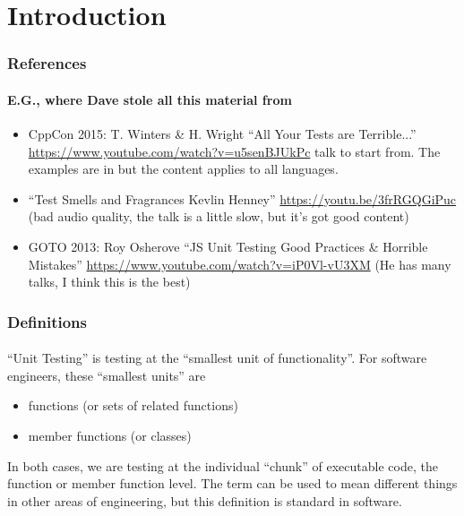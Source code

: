 \section{Introduction}

\begin{frame}[fragile]
\frametitle{References}
\framesubtitle{E.G., where Dave stole all this material from}

\begin{itemize}
\item CppCon 2015: T. Winters \& H. Wright ``All Your Tests are Terrible...''
  \url{https://www.youtube.com/watch?v=u5senBJUkPc}
   talk to start from.  The examples are in \CC but the
  content applies to all languages.
\vskip 6pt
\item ``Test Smells and Fragrances Kevlin Henney''
  \url{https://youtu.be/3frRGQGiPuc} (bad audio
  quality, the talk is a little slow, but it's got good content)



\item GOTO 2013: Roy Osherove ``JS Unit Testing Good Practices \& Horrible Mistakes''
\url{https://www.youtube.com/watch?v=iP0Vl-vU3XM}  (He has many talks,
I think this is the best)

\end{itemize}


\end{frame}


\begin{frame}[fragile]
\frametitle{Definitions}
\framesubtitle{}
``Unit Testing'' is testing at the ``smallest unit of
functionality''.  For software engineers, these 
``smallest units'' are
\begin{itemize}
\item functions (or sets of related functions)
\item member functions (or classes)
\end{itemize}

In both cases, we are testing at the individual ``chunk'' of
executable code, the function or member function level.
\vskip 6pt
The term can be used to mean different things in other areas of
engineering, but this definition is standard in software.



\end{frame}



